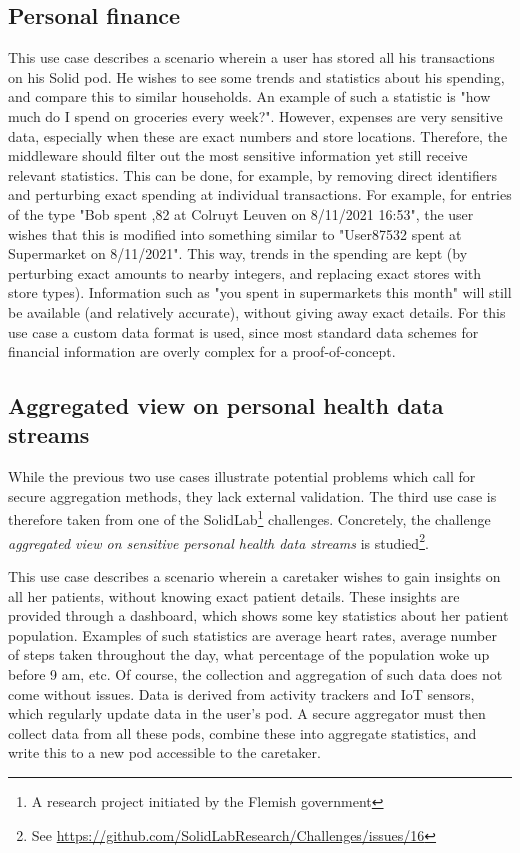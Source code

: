 \subsection{Personal finance}
\label{usecase:personal-finance}
This use case describes a scenario wherein a user has stored all his transactions on his Solid pod. He wishes to see some trends and statistics about his spending, and compare this to similar households. An example of such a statistic is "how much do I spend on groceries every week?".  However, expenses are very sensitive data, especially when these are exact numbers and store locations. Therefore, the middleware should filter out the most sensitive information yet still receive relevant statistics. This can be done, for example, by removing direct identifiers and perturbing exact spending at individual transactions. For example, for entries of the type "Bob spent ,82 at Colruyt Leuven on 8/11/2021 16:53", the user wishes that this is modified into something similar to "User87532 spent  at Supermarket on 8/11/2021". This way, trends in the spending are kept (by perturbing exact amounts to nearby integers, and replacing exact stores with store types). Information such as "you spent  in supermarkets this month" will still be available (and relatively accurate), without giving away exact details. For this use case a custom data format is used, since most standard data schemes for financial information are overly complex for a proof-of-concept.

\subsection{Aggregated view on personal health data streams}
While the previous two use cases illustrate potential problems which call for secure aggregation methods, they lack external validation. The third use case is therefore taken from one of the SolidLab\footnote{A research project initiated by the Flemish government } challenges. Concretely, the challenge \textit{aggregated view on sensitive personal health data streams} is studied\footnote{See \url{https://github.com/SolidLabResearch/Challenges/issues/16}}.

This use case describes a scenario wherein a caretaker wishes to gain insights on all her patients, without knowing exact patient details. These insights are provided through a dashboard, which shows some key statistics about her patient population. Examples of such statistics are average heart rates, average number of steps taken throughout the day, what percentage of the population woke up before 9 am, etc. Of course, the collection and aggregation of such data does not come without issues. Data is derived from activity trackers and IoT sensors, which regularly update data in the user's pod. A secure aggregator must then collect data from all these pods, combine these into aggregate statistics, and write this to a new pod accessible to the caretaker.

